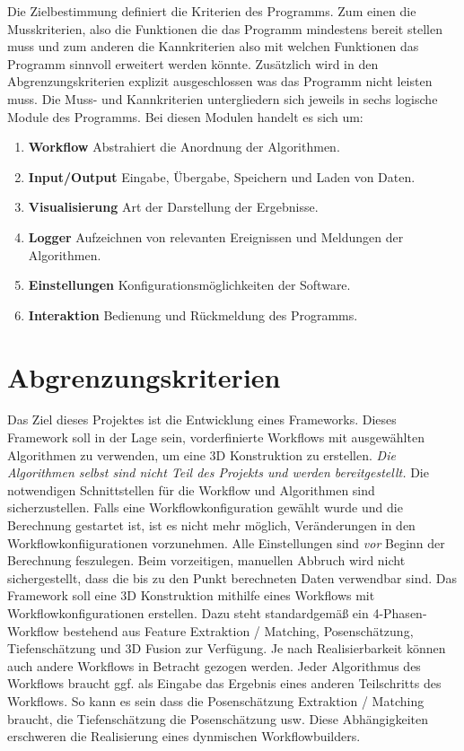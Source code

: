 Die Zielbestimmung definiert die Kriterien des Programms. Zum einen die Musskriterien, also die Funktionen die das Programm mindestens bereit stellen muss und zum anderen die Kannkriterien also mit welchen Funktionen das Programm sinnvoll erweitert werden könnte. Zusätzlich wird in den Abgrenzungskriterien explizit ausgeschlossen was das Programm nicht leisten muss. Die Muss- und Kannkriterien untergliedern sich jeweils in sechs logische Module des Programms. Bei diesen Modulen handelt es sich um:
\begin{enumerate}
	\item \textbf{Workflow} Abstrahiert die Anordnung der Algorithmen.
	\item \textbf{Input/Output} Eingabe, Übergabe, Speichern und Laden von Daten.
	\item \textbf{Visualisierung} Art der Darstellung der Ergebnisse.
	\item \textbf{Logger} Aufzeichnen von relevanten Ereignissen und Meldungen der Algorithmen.
	\item \textbf{Einstellungen} Konfigurationsmöglichkeiten der Software.
	\item \textbf{Interaktion} Bedienung und Rückmeldung des Programms.
\end{enumerate}

\section{Abgrenzungskriterien}
Das Ziel dieses Projektes ist die Entwicklung eines Frameworks. Dieses Framework soll in der Lage sein, vorderfinierte Workflows mit ausgewählten Algorithmen zu verwenden, um eine 3D Konstruktion zu erstellen. \textit{Die Algorithmen selbst sind nicht Teil des Projekts und werden bereitgestellt.} Die notwendigen Schnittstellen für die Workflow und Algorithmen sind sicherzustellen. \newline
Falls eine Workflowkonfiguration gewählt wurde und die Berechnung gestartet ist, ist es nicht mehr möglich, Veränderungen in den Workflowkonfiigurationen vorzunehmen. Alle Einstellungen sind \textit{vor} Beginn der Berechnung feszulegen. Beim vorzeitigen, manuellen Abbruch wird nicht sichergestellt, dass die bis zu den Punkt berechneten Daten verwendbar sind. \newline
Das Framework soll eine 3D Konstruktion mithilfe eines Workflows mit Workflowkonfigurationen erstellen. Dazu steht standardgemäß ein 4-Phasen-Workflow bestehend aus Feature Extraktion / Matching, Posenschätzung, Tiefenschätzung und 3D Fusion zur Verfügung. Je nach Realisierbarkeit können auch andere Workflows in Betracht gezogen werden.
Jeder Algorithmus des Workflows braucht ggf. als Eingabe das Ergebnis eines anderen Teilschritts des Workflows. So kann es sein dass die Posenschätzung Extraktion / Matching braucht, die Tiefenschätzung die Posenschätzung usw.
Diese Abhängigkeiten erschweren die Realisierung eines dynmischen Workflowbuilders. 

